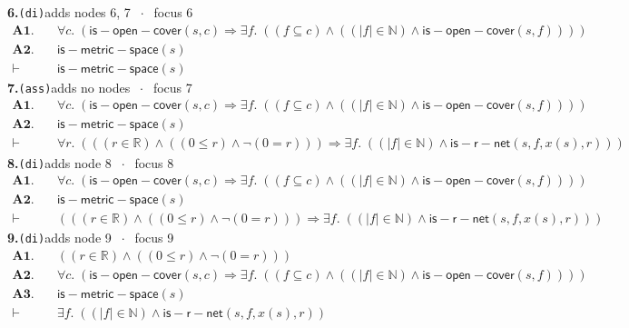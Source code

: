 \documentclass[11pt]{article}
\begin{document}
\medskip\noindent\textbf{6.}\quad \texttt{(di)}\hfill{\small adds nodes 6, 7 $\;\cdot\;$ focus 6}\\[2pt]
\begin{align*}
  \mathbf{A1.}\quad & \forall c.\; (\mathsf{is{-}open{-}cover}(s, c) \Rightarrow \exists f.\; ((f \subseteq c) \wedge ((|f| \in \mathbb{N}) \wedge \mathsf{is{-}open{-}cover}(s, f)))) \\
  \mathbf{A2.}\quad & \mathsf{is{-}metric{-}space}(s) \\
  \vdash\quad & \mathsf{is{-}metric{-}space}(s)
\end{align*}
\medskip\noindent\textbf{7.}\quad \texttt{(ass)}\hfill{\small adds no nodes $\;\cdot\;$ focus 7}\\[2pt]
\begin{align*}
  \mathbf{A1.}\quad & \forall c.\; (\mathsf{is{-}open{-}cover}(s, c) \Rightarrow \exists f.\; ((f \subseteq c) \wedge ((|f| \in \mathbb{N}) \wedge \mathsf{is{-}open{-}cover}(s, f)))) \\
  \mathbf{A2.}\quad & \mathsf{is{-}metric{-}space}(s) \\
  \vdash\quad & \forall r.\; (((r \in \mathbb{R}) \wedge ((0 \leq r) \wedge \neg (0 = r))) \Rightarrow \exists f.\; ((|f| \in \mathbb{N}) \wedge \mathsf{is{-}r{-}net}(s, f, x(s), r)))
\end{align*}
\medskip\noindent\textbf{8.}\quad \texttt{(di)}\hfill{\small adds node 8 $\;\cdot\;$ focus 8}\\[2pt]
\begin{align*}
  \mathbf{A1.}\quad & \forall c.\; (\mathsf{is{-}open{-}cover}(s, c) \Rightarrow \exists f.\; ((f \subseteq c) \wedge ((|f| \in \mathbb{N}) \wedge \mathsf{is{-}open{-}cover}(s, f)))) \\
  \mathbf{A2.}\quad & \mathsf{is{-}metric{-}space}(s) \\
  \vdash\quad & (((r \in \mathbb{R}) \wedge ((0 \leq r) \wedge \neg (0 = r))) \Rightarrow \exists f.\; ((|f| \in \mathbb{N}) \wedge \mathsf{is{-}r{-}net}(s, f, x(s), r)))
\end{align*}
\medskip\noindent\textbf{9.}\quad \texttt{(di)}\hfill{\small adds node 9 $\;\cdot\;$ focus 9}\\[2pt]
\begin{align*}
  \mathbf{A1.}\quad & ((r \in \mathbb{R}) \wedge ((0 \leq r) \wedge \neg (0 = r))) \\
  \mathbf{A2.}\quad & \forall c.\; (\mathsf{is{-}open{-}cover}(s, c) \Rightarrow \exists f.\; ((f \subseteq c) \wedge ((|f| \in \mathbb{N}) \wedge \mathsf{is{-}open{-}cover}(s, f)))) \\
  \mathbf{A3.}\quad & \mathsf{is{-}metric{-}space}(s) \\
  \vdash\quad & \exists f.\; ((|f| \in \mathbb{N}) \wedge \mathsf{is{-}r{-}net}(s, f, x(s), r))
\end{align*}
\end{document}
